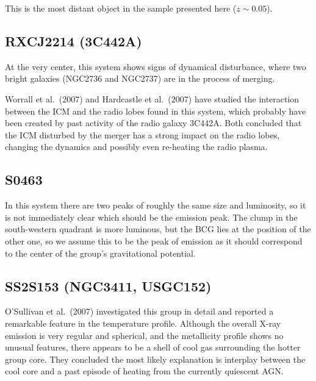 \documentclass[structabstract]{aa}
\begin{document}
This is the most distant object in the sample presented here ($z\sim0.05$).
 \subsection*{RXCJ2214 (3C442A)}
At the very center, this system shows signs of dynamical disturbance, where
two bright galaxies (NGC2736 and NGC2737) are in the process of merging.

Worrall et al.\ (2007) and Hardcastle et al.\ (2007) have studied the
interaction between the ICM and the radio lobes found in this system, which
probably have been created by past activity of the radio galaxy 3C442A. Both
concluded that the ICM disturbed by the merger has a strong impact on the
radio lobes, changing the dynamics and possibly even re-heating the radio plasma.
 \subsection*{S0463}
In this system there are two peaks of roughly the same size and luminosity, so
it is not immediately clear which should be the emission peak. The clump in
the south-western quadrant is more luminous, but the BCG lies at the position
of the other one, so we assume this to be the peak of emission as it should
correspond to the center of the group's gravitational potential.
 \subsection*{SS2S153 (NGC3411, USGC152)}
O'Sullivan et al.\ (2007) investigated this group in detail and reported a
remarkable feature in the temperature profile. Although the overall X-ray
emission is very regular and spherical, and the metallicity profile shows no
unusual features, there appears to be a shell of cool gas surrounding the
hotter group core. They concluded the most likely explanation is interplay
between the cool core and a past episode of heating from the currently
quiescent AGN.
%
\end{document}
